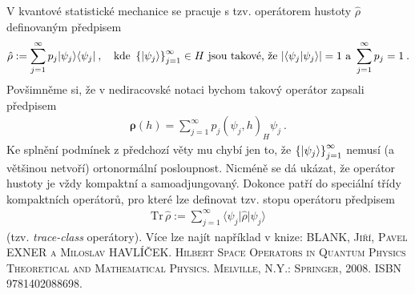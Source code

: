 \begin{remark}
V kvantové statistické mechanice se pracuje s tzv. operátorem hustoty $\hat{\rho}$ definovaným předpisem \begin{align*}
    \hat{\rho} := \sum_{j=1}^\infty p_j \lvert \psi_j \rangle \langle \psi_j \rvert \:, \quad \text{kde } \left \lbrace \lvert \psi_j \rangle \right \rbrace_{j=1}^\infty \in H \text{ jsou takové, že } |\langle \psi_j \lvert \psi_j \rangle |=1 \text{ a } \sum_{j=1}^\infty p_j =1 \:.
\end{align*}
Povšimněme si, že v nediracovské notaci bychom takový operátor zapsali předpisem \begin{align*}
    \boldsymbol \rho (h) = \sum_{j=1}^\infty p_j (\psi_j,h)_H \psi_j \:.
\end{align*}
Ke splnění podmínek z předchozí věty mu chybí jen to, že $\left \lbrace \lvert \psi_j \rangle \right \rbrace_{j=1}^\infty$ nemusí (a většinou netvoří) ortonormální posloupnost. Nicméně se dá ukázat, že operátor hustoty je vždy kompaktní a samoadjungovaný. Dokonce patří do speciální třídy kompaktních operátorů, pro které lze definovat tzv. stopu operátoru předpisem \begin{align*}
    \mathrm{Tr}\, \hat \rho := \sum_{j=1}^\infty \langle \psi_j \rvert \hat \rho \lvert \psi_j \rangle
\end{align*}
(tzv. \textit{trace-class} operátory).
Více lze najít například v knize: \textsc{BLANK, Jiří, Pavel EXNER a Miloslav HAVLÍČEK. Hilbert Space Operators in Quantum Physics Theoretical and Mathematical Physics. Melville, N.Y.: Springer, 2008. ISBN 9781402088698.}

\end{remark}

